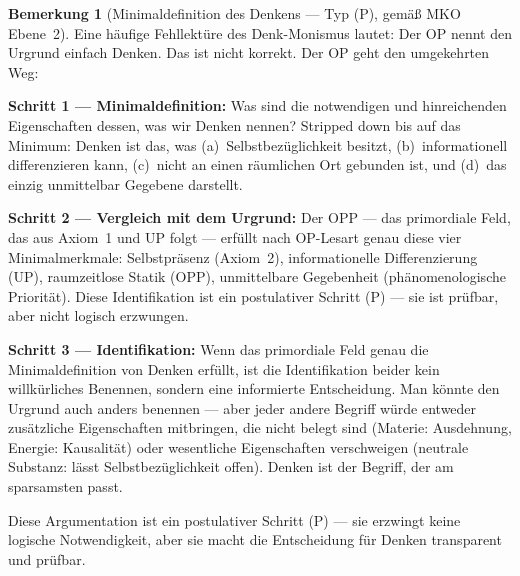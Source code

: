 \documentclass[11pt,a4paper]{article}
\theoremstyle{plain}
\theoremstyle{definition}
\newtheorem{remark}{Bemerkung}[section]
\begin{document}
\begin{remark}[Minimaldefinition des Denkens --- Typ (P), gem\"{a}\ss{} MKO Ebene~2]
Eine h\"{a}ufige Fehllekt\"{u}re des Denk-Monismus lautet: \glqq{}Der OP nennt den Urgrund
einfach Denken.\grqq{} Das ist nicht korrekt. Der OP geht den umgekehrten Weg:

\textbf{Schritt 1 --- Minimaldefinition:} Was sind die notwendigen und hinreichenden
Eigenschaften dessen, was wir \glqq{}Denken\grqq{} nennen? Stripped down bis auf das
Minimum: Denken ist das, was (a)~Selbstbez\"{u}glichkeit besitzt, (b)~informationell
differenzieren kann, (c)~nicht an einen r\"{a}umlichen Ort gebunden ist, und (d)~das
einzig unmittelbar Gegebene darstellt.

\textbf{Schritt 2 --- Vergleich mit dem Urgrund:} Der OPP --- das primordiale Feld,
das aus Axiom~1 und UP folgt --- erf\"{u}llt nach OP-Lesart genau diese vier
Minimalmerkmale: Selbstpr\"{a}senz (Axiom~2), informationelle Differenzierung (UP),
raumzeitlose Statik (OPP), unmittelbare Gegebenheit (ph\"{a}nomenologische Priorit\"{a}t).
Diese Identifikation ist ein postulativer Schritt (P) --- sie ist pr\"{u}fbar, aber nicht
logisch erzwungen.

\textbf{Schritt 3 --- Identifikation:} Wenn das primordiale Feld genau die
Minimaldefinition von Denken erf\"{u}llt, ist die Identifikation beider kein
willk\"{u}rliches Benennen, sondern eine informierte Entscheidung. Man k\"{o}nnte den
Urgrund auch anders benennen --- aber jeder andere Begriff w\"{u}rde entweder zus\"{a}tzliche
Eigenschaften mitbringen, die nicht belegt sind (Materie: Ausdehnung, Energie:
Kausalit\"{a}t) oder wesentliche Eigenschaften verschweigen (neutrale Substanz:
l\"{a}sst Selbstbez\"{u}glichkeit offen). Denken ist der Begriff, der am sparsamsten
passt.

Diese Argumentation ist ein postulativer Schritt (P) --- sie erzwingt keine logische
Notwendigkeit, aber sie macht die Entscheidung f\"{u}r \glqq{}Denken\grqq{} transparent
und pr\"{u}fbar.
\end{remark}
\end{document}

